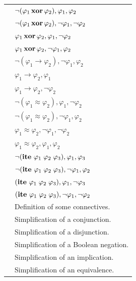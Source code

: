\begin{xltabular}{\linewidth}{l X}
 & $ \neg (\varphi_1 \,\mathbf{xor}\, \varphi_2) , \varphi_1 , \varphi_2 $ \\
 & $ \neg (\varphi_1 \,\mathbf{xor}\, \varphi_2), \neg \varphi_1, \neg \varphi_2 $ \\
 & $ \varphi_1 \,\mathbf{xor}\, \varphi_2, \varphi_1 , \neg \varphi_2 $ \\
 & $ \varphi_1 \,\mathbf{xor}\, \varphi_2, \neg \varphi_1 , \varphi_2 $ \\
 & $ \neg (\varphi_1 \rightarrow \varphi_2), \neg \varphi_1 , \varphi_2 $ \\
 & $ \varphi_1 \rightarrow \varphi_2, \varphi_1 $ \\
 & $ \varphi_1 \rightarrow \varphi_2, \neg \varphi_2 $ \\
 & $\neg (\varphi_1 ≈ \varphi_2) , \varphi_1 , \neg \varphi_2$ \\
 & $\neg (\varphi_1 ≈ \varphi_2) , \neg \varphi_1 , \varphi_2$ \\
 & $\varphi_1 ≈ \varphi_2 , \neg \varphi_1 , \neg \varphi_2$ \\
 & $\varphi_1 ≈ \varphi_2 , \varphi_1 , \varphi_2$ \\
 & $\neg (\lsymb{ite}\ \varphi_1\;\varphi_2\;\varphi_3) , \varphi_1 , \varphi_3$ \\
 & $\neg (\lsymb{ite}\ \varphi_1\;\varphi_2\;\varphi_3) , \neg \varphi_1 , \varphi_2$ \\
 & $(\lsymb{ite}\ \varphi_1\;\varphi_2\;\varphi_3) , \varphi_1 , \neg \varphi_3$ \\
 & $(\lsymb{ite}\ \varphi_1\;\varphi_2\;\varphi_3) , \neg \varphi_1 , \neg \varphi_2$ \\
 & Definition of some connectives. \\
 & Simplification of a conjunction. \\
 & Simplification of a disjunction. \\
 & Simplification of a Boolean negation. \\
 & Simplification of an implication. \\
 & Simplification of an equivalence. \\

\end{xltabular}
